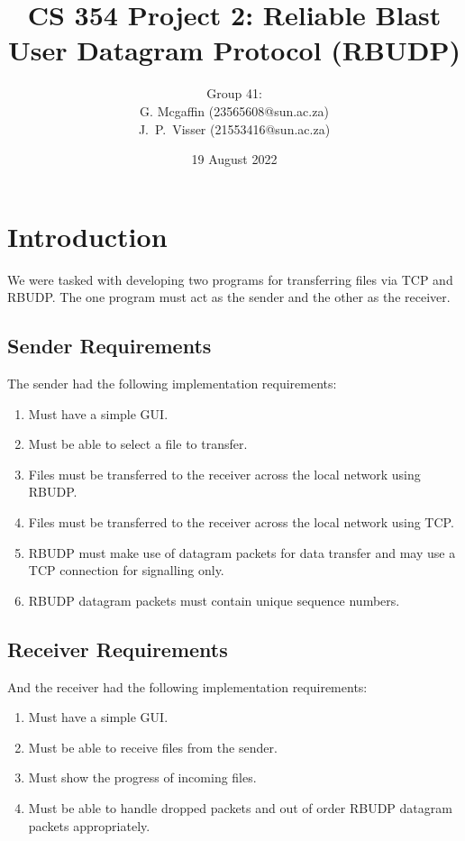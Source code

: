 \documentclass[10pt, a4paper]{article}
\title{CS 354 Project 2: Reliable Blast User Datagram Protocol (RBUDP)}
\author{Group 41: \vspace{0.5em} \\
        G. Mcgaffin (23565608@sun.ac.za) \vspace{0.3em} \\
        J.\ P.\ Visser (21553416@sun.ac.za)}
\date{19 August 2022}
\begin{document}
\maketitle

\tableofcontents
\newpage


\section{Introduction}
\label{sec:intro}

We were tasked with developing two programs for transferring files via TCP and
RBUDP. The one program must act as the sender and the other as the receiver.

\subsection{Sender Requirements}
\label{subsec:sender-req}

The sender had the following implementation requirements:
\begin{enumerate}
  \item Must have a simple GUI.
  \item Must be able to select a file to transfer.
  \item Files must be transferred to the receiver across the local network using
    RBUDP.
  \item Files must be transferred to the receiver across the local network using
    TCP.
  \item RBUDP must make use of datagram packets for data transfer and may use a
    TCP connection for signalling only.
  \item RBUDP datagram packets must contain unique sequence numbers.
\end{enumerate}

\subsection{Receiver Requirements}
\label{subsec:receiver-req}

And the receiver had the following implementation requirements:
\begin{enumerate}
  \item Must have a simple GUI.
  \item Must be able to receive files from the sender.
  \item Must show the progress of incoming files.
  \item Must be able to handle dropped packets and out of order RBUDP datagram
    packets appropriately.
\end{enumerate}
\end{document}
